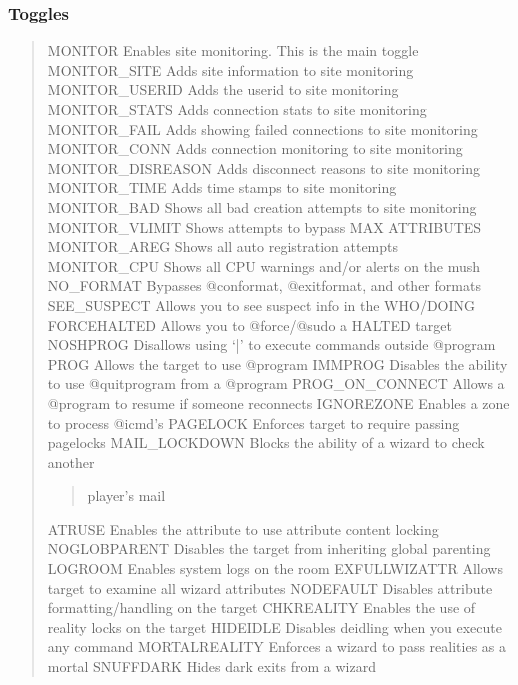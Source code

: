 \documentclass[letterpaper,10pt,english]{sphinxmanual}
\begin{document}
\subsubsection{Toggles}
\label{\detokenize{security:toggles}}\begin{quote}

\sphinxAtStartPar
MONITOR            \sphinxhyphen{} Enables site monitoring.  This is the main toggle
MONITOR\_SITE       \sphinxhyphen{} Adds site information to site monitoring
MONITOR\_USERID     \sphinxhyphen{} Adds the userid to site monitoring
MONITOR\_STATS      \sphinxhyphen{} Adds connection stats to site monitoring
MONITOR\_FAIL       \sphinxhyphen{} Adds showing failed connections to site monitoring
MONITOR\_CONN       \sphinxhyphen{} Adds connection monitoring to site monitoring
MONITOR\_DISREASON  \sphinxhyphen{} Adds disconnect reasons to site monitoring
MONITOR\_TIME       \sphinxhyphen{} Adds time stamps to site monitoring
MONITOR\_BAD        \sphinxhyphen{} Shows all bad creation attempts to site monitoring
MONITOR\_VLIMIT     \sphinxhyphen{} Shows attempts to bypass MAX ATTRIBUTES
MONITOR\_AREG       \sphinxhyphen{} Shows all auto registration attempts
MONITOR\_CPU        \sphinxhyphen{} Shows all CPU warnings and/or alerts on the mush
NO\_FORMAT          \sphinxhyphen{} Bypasses @conformat, @exitformat, and other formats
SEE\_SUSPECT        \sphinxhyphen{} Allows you to see suspect info in the WHO/DOING
FORCEHALTED        \sphinxhyphen{} Allows you to @force/@sudo a HALTED target
NOSHPROG           \sphinxhyphen{} Disallows using ‘|’ to execute commands outside @program
PROG               \sphinxhyphen{} Allows the target to use @program
IMMPROG            \sphinxhyphen{} Disables the ability to use @quitprogram from a @program
PROG\_ON\_CONNECT    \sphinxhyphen{} Allows a @program to resume if someone reconnects
IGNOREZONE         \sphinxhyphen{} Enables a zone to process @icmd’s
PAGELOCK           \sphinxhyphen{} Enforces target to require passing pagelocks
MAIL\_LOCKDOWN      \sphinxhyphen{} Blocks the ability of a wizard to check another
\begin{quote}

\sphinxAtStartPar
player’s mail
\end{quote}

\sphinxAtStartPar
ATRUSE             \sphinxhyphen{} Enables the attribute to use attribute content locking
NOGLOBPARENT       \sphinxhyphen{} Disables the target from inheriting global parenting
LOGROOM            \sphinxhyphen{} Enables system logs on the room
EXFULLWIZATTR      \sphinxhyphen{} Allows target to examine all wizard attributes
NODEFAULT          \sphinxhyphen{} Disables attribute formatting/handling on the target
CHKREALITY         \sphinxhyphen{} Enables the use of reality locks on the target
HIDEIDLE           \sphinxhyphen{} Disables deidling when you execute any command
MORTALREALITY      \sphinxhyphen{} Enforces a wizard to pass realities as a mortal
SNUFFDARK          \sphinxhyphen{} Hides dark exits from a wizard
\end{quote}
\end{document}
